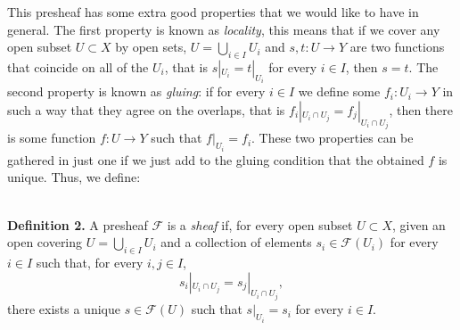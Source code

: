 \documentclass[12pt,a4paper]{article}
\begin{document}
  This presheaf has some extra good properties that we would like to have in general. The first property is known as \emph{locality}, this means that if we cover any open subset $U\subset X$ by open sets, $U=\bigcup_{i\in I} U_i$ and $s,t: U \rightarrow Y$ are two functions that coincide on all of the $U_i$, that is $s|_{U_i}=t|_{U_i}$ for every $i\in I$, then $s=t$. The second property is known as \emph{gluing}: if for every $i \in I$ we define some $f_i:U_i \rightarrow Y$ in such a way that they agree on the overlaps, that is $f_i|_{U_i\cap U_j} = f_j|_{U_i \cap U_j}$, then there is some function $f:U \rightarrow Y$ such that $f|_{U_i} =f_i$. These two properties can be gathered in just one if we just add to the gluing condition that the obtained $f$ is unique. Thus, we define:

  \ \\
  \textbf{Definition 2.} A presheaf $\mathcal{F}$ is a \emph{sheaf} if, for every open subset $U\subset X$, given an open covering $U=\bigcup_{i\in I} U_i$ and a collection of elements $s_i \in \mathcal{F}(U_i)$ for every $i\in I$ such that, for every $i,j \in I$, 
  \begin{equation*}
    s_i|_{U_i \cap U_j} = s_j|_{U_i \cap U_j},
  \end{equation*}
  there exists a unique $s\in \mathcal{F}(U)$ such that $s|_{U_i}=s_i$ for every $i\in I$.     \\
\end{document}
